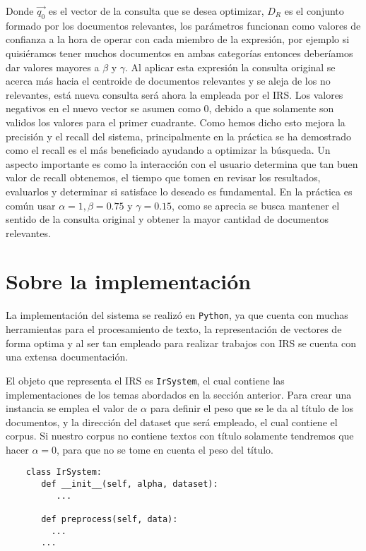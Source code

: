 \documentclass[runningheads,a4paper]{llncs}
\begin{document}
Donde $\overrightarrow{q_0}$ es el vector de la consulta que se desea optimizar, $D_R$ es el conjunto formado por los documentos relevantes, los parámetros funcionan como valores de confianza a la hora de operar con cada miembro de la expresión, por ejemplo si quisiéramos tener muchos documentos en ambas categorías entonces deberíamos dar valores mayores a $\beta$ y $\gamma$. Al aplicar esta expresión la consulta original se acerca más hacia el centroide de documentos relevantes y se aleja de los no relevantes, está nueva consulta será ahora la empleada por el IRS. Los valores negativos en el nuevo vector se asumen como 0, debido a que solamente son validos los valores para el primer cuadrante. Como hemos dicho esto mejora la precisión y el recall del sistema, principalmente en la práctica se ha demostrado como el recall es el más beneficiado ayudando a optimizar la búsqueda. Un aspecto importante es como la interacción con el usuario determina que tan buen valor de recall obtenemos, el tiempo que tomen en revisar los resultados, evaluarlos y determinar si satisface lo deseado es fundamental. En la práctica es común usar $\alpha = 1, \beta = 0.75$ y $\gamma = 0.15$, como se aprecia se busca mantener el sentido de la consulta original y obtener la mayor cantidad de documentos relevantes.

\section{Sobre la implementación} %

La implementación del sistema se realizó en \verb*|Python|, ya que cuenta con muchas herramientas para el procesamiento de texto, la representación de vectores de forma optima y al ser tan empleado para realizar trabajos con IRS se cuenta con una extensa documentación.

El objeto que representa el IRS es \verb*|IrSystem|, el cual contiene las implementaciones de los temas abordados en la sección anterior. Para crear una instancia se emplea el valor de $\alpha$ para definir el peso que se le da al título de los documentos, y la dirección del dataset que será empleado, el cual contiene el corpus. Si nuestro corpus no contiene textos con título solamente tendremos que hacer $\alpha = 0$, para que no se tome en cuenta el peso del título.

\noindent
%
\begin{verbatim}
	class IrSystem:	   
	   def __init__(self, alpha, dataset):
	      ...
	      
	   def preprocess(self, data):
	     ...	     
	   ...
\end{verbatim}
%
\noindent
\end{document}

